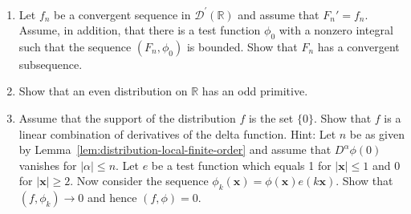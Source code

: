 \begin{enumerate}[label=\thesection.\arabic*.,ref=\thesection.\arabic*,start=20,series=book-problems]
\item\label{ex:distribution-primitives-convergent-subsequence} Let $f_n$ be a convergent sequence in $\mathcal{D}^{\prime}(\mathbb{R})$ and assume that $F_n'=f_n$. Assume, in addition, that there is a test function $\phi_0$ with a nonzero integral such that the sequence $(F_n,\phi_0)$ is bounded. Show that $F_n$ has a convergent subsequence.

\item\label{ex:even-distribution-odd-primitive} Show that an even distribution on $\mathbb{R}$ has an odd primitive.

\item\label{ex:point-supported-distribution-delta-derivatives} Assume that the support of the distribution $f$ is the set $\{0\}$. Show that $f$ is a linear combination of derivatives of the delta function. Hint: Let $n$ be as given by Lemma~\ref{lem:distribution-local-finite-order} and assume that $D^\alpha\phi(0)$ vanishes for $|\alpha|\leq n$. Let $e$ be a test function which equals 1 for $|\bm{x}|\leq1$ and 0 for $|\bm{x}|\geq2$. Now consider the sequence $\phi_k(\bm{x})=\phi(\bm{x})e(k\bm{x})$. Show that $(f,\phi_k)\to0$ and hence $(f,\phi)=0$.

\end{enumerate}
